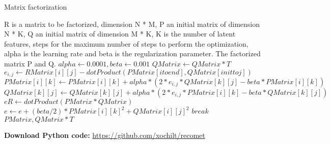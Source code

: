 \begin{algorithm}
\caption{Matrix factorization}
\begin{algorithmic}
\REQUIRE R is a matrix to be factorized, dimension N * M, P an initial
matrix of dimension N * K, Q an initial matrix of dimension M * K, K
is the number of latent features, steps for the maximum number of
steps to perform the optimization,  alpha is the learning rate and
beta  is the regularization parameter.
\ENSURE The factorized matrix P and Q.
\STATE $alpha \leftarrow 0.0001, beta \leftarrow 0.001$ 
\STATE $QMatrix \leftarrow QMatrix * T $ 
\STATE $e_{i,j} \leftarrow RMatrix[i][j]-dotProduct(PMatrix[i to end],QMatrix[init to j])$
\ENDIF
{}
\STATE $PMatrix[i][k] \leftarrow PMatrix[i][k]+alpha * (2*e_{i,j}*QMatrix[k][j] - beta *PMatrix[i][k])$
\STATE $QMatrix[k][j] \leftarrow QMatrix[k][j]+alpha * (2*e_{i,j}*PMatrix[i][k] - beta *QMatrix[k][j])$
\ENDFOR
\ENDFOR
\ENDFOR
\STATE $eR \leftarrow dotProduct (PMatrix * QMatrix)$
\STATE $e \leftarrow e + (beta/2) * PMatrix[i][k]^2 + QMatrix[i][j]^2$
\ENDIF
\ENDFOR
\ENDFOR
{}
\STATE $break$
\ENDIF
\ENDFOR
\RETURN $PMatrix, QMatrix * T$ 
\end{algorithmic}
\end{algorithm}


\textbf{Download Python code:} \url{https://github.com/xochilt/recomet}


